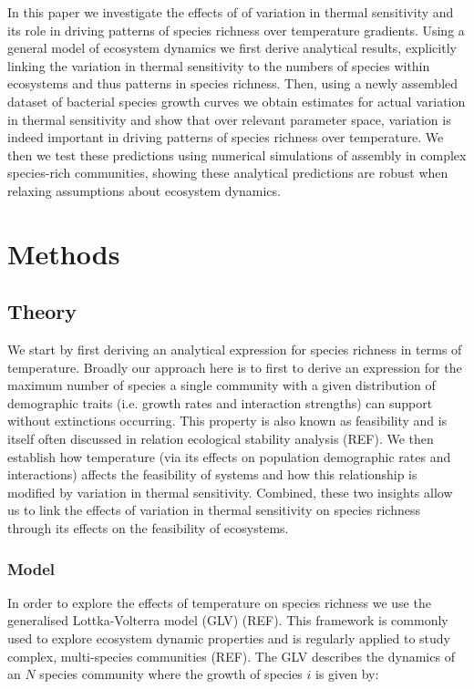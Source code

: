 \documentclass{article}
\begin{document}
In this paper we investigate the effects of of variation in thermal sensitivity and its role in driving patterns of species richness over temperature gradients. Using a general model of ecosystem dynamics we first derive analytical results, explicitly linking the variation in thermal sensitivity to the numbers of species within ecosystems and thus patterns in species richness. Then, using a newly assembled dataset of bacterial species growth curves we obtain estimates for actual variation in thermal sensitivity and show that over relevant parameter space, variation is indeed important in driving patterns of species richness over temperature. We then we test these predictions using numerical simulations of assembly in complex species-rich communities, showing these analytical predictions are robust when relaxing assumptions about ecosystem dynamics.  

\section{Methods}
\subsection{Theory}
 We start by first deriving an analytical expression for species richness in terms of temperature. Broadly our approach here is to first to derive an expression for the maximum number of species a single community with a given distribution of demographic traits (i.e. growth rates and interaction strengths) can support without extinctions occurring. This property is also known as feasibility and is itself often discussed in relation ecological stability analysis (REF). We then establish how temperature (via its effects on population demographic rates and interactions) affects the feasibility of systems and how this relationship is modified by variation in thermal sensitivity. Combined, these two insights allow us to link the effects of variation in thermal sensitivity on species richness through its effects on the feasibility of ecosystems. 

\subsubsection{Model}
In order to explore the effects of temperature on species richness we use the generalised Lottka-Volterra model (GLV) (REF). This framework is commonly used to explore ecosystem dynamic properties and is regularly applied to study complex, multi-species communities (REF). The GLV describes the dynamics of an $N$ species community where the growth of species $i$ is given by:
\end{document}
